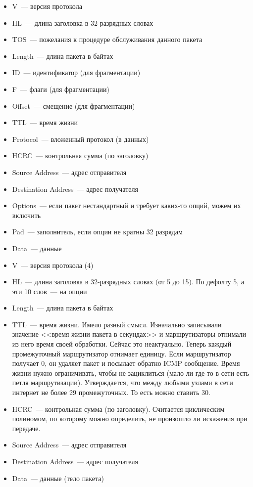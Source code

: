 \begin{itemize}
    \item V~--- версия протокола
    \item HL~--- длина заголовка в 32-разрядных словах
    \item TOS~--- пожелания к процедуре обслуживания данного пакета
    \item Length~--- длина пакета в байтах
    \item ID~--- идентификатор (для фрагментации)
    \item F~--- флаги (для фрагментации)
    \item Offset~--- смещение (для фрагментации)
    \item TTL~--- время жизни
    \item Protocol~--- вложенный протокол (в данных)
    \item HCRC~--- контрольная сумма (по заголовку)
    \item Source Address~--- адрес отправителя
    \item Destination Address~--- адрес получателя
    \item Options~--- если пакет нестандартный и требует каких-то опций, можем их включить
    \item Pad~--- заполнитель, если опции не кратны 32 разрядам
    \item Data~--- данные
\end{itemize}


\begin{itemize}
    \item V~--- версия протокола (4)
    \item HL~--- длина заголовка в 32-разрядных словах (от 5 до 15). По дефолту 5, а эти 10 слов~--- на опции
    \item Length~--- длина пакета в байтах
    \item TTL~--- время жизни. Имело разный смысл. Изначально записывали значение <<время жизни пакета в секундах>> и маршрутизаторы отнимали из него время своей обработки. Сейчас это неактуально. Теперь каждый промежуточный маршрутизатор отнимает единицу. Если маршрутизатор получает 0, он удаляет пакет и посылает обратно ICMP сообщение. Время жизни нужно ограничивать, чтобы не зациклиться (мало ли где-то в сети есть петля маршрутизации). Утверждается, что между любыми узлами в сети интернет не более 29 промежуточных. То есть можно ставить 30.
    \item HCRC~--- контрольная сумма (по заголовку). Считается циклическим полиномом, по которому можно определить, не произошло ли искажения при передаче.
    \item Source Address~--- адрес отправителя
    \item Destination Address~--- адрес получателя
    \item Data~--- данные (тело пакета)
\end{itemize}

